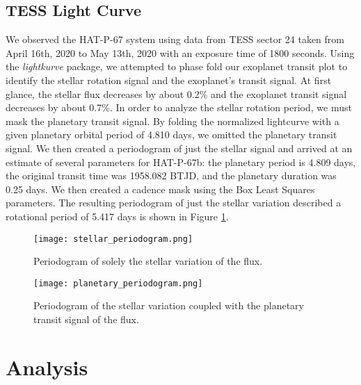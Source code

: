 \documentclass{aastex631}
\begin{document}
\subsection{TESS Light Curve}
We observed the HAT-P-67 system using data from TESS sector 24 taken from April 16th, 2020 to May 13th, 2020 with an exposure time of 1800 seconds. Using the \textit{lightkurve} package, we attempted to phase fold our exoplanet transit plot to identify the stellar rotation signal and the exoplanet's transit signal. At first glance, the stellar flux decreases by about 0.2\% and the exoplanet transit signal decreases by about 0.7\%. In order to analyze the stellar rotation period, we must mask the planetary transit signal. By folding the normalized lightcurve with a given planetary orbital period of 4.810 days, we omitted the planetary transit signal. We then created a periodogram of just the stellar signal and arrived at an estimate of several parameters for HAT-P-67b: the planetary period is 4.809 days, the original transit time was 1958.082 BTJD, and the planetary duration was 0.25 days. We then created a cadence mask using the Box Least Squares parameters. The resulting periodogram of just the stellar variation described a rotational period of 5.417 days is shown in Figure \ref{fig:stellar_periodogram}.

\begin{figure}
    \texttt{[image: stellar\_periodogram.png]}
    \caption{Periodogram of solely the stellar variation of the flux. }
    \label{fig:stellar_periodogram}
\end{figure}

\begin{figure}
    \texttt{[image: planetary\_periodogram.png]}
    \caption{Periodogram of the stellar variation coupled with the planetary transit signal of the flux. }
    \label{fig:planetary_periodogram}
\end{figure}

\section{Analysis}
\end{document}

